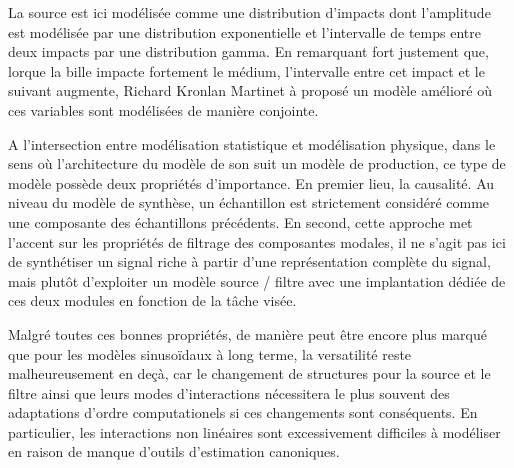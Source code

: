 \begin{marginfigure}
  \scalebox{.6}{
  }
  \label{fig:modal}
\caption{}
\end{marginfigure}

La source est ici modélisée comme une distribution d'impacts dont l'amplitude est modélisée par une distribution exponentielle et l'intervalle de temps entre deux impacts par une distribution gamma. En remarquant fort justement que, lorque la bille impacte fortement le médium, l'intervalle entre cet impact et le suivant augmente, Richard Kronlan Martinet\cite{conan2014synthesis} à proposé un modèle amélioré où ces variables sont modélisées de manière conjointe.

A l'intersection entre modélisation statistique et modélisation physique, dans le sens où l'architecture du modèle de son suit un modèle de production, ce type de modèle possède deux propriétés d'importance. En premier lieu, la causalité. Au niveau du modèle de synthèse, un échantillon est strictement considéré comme une composante des échantillons précédents. En second, cette approche met l'accent sur les propriétés de filtrage des composantes modales, il ne s'agit pas ici de synthétiser un signal riche à partir d'une représentation complète du signal, mais plutôt d'exploiter un modèle source / filtre avec une implantation dédiée de ces deux modules en fonction de la tâche visée.


Malgré toutes ces bonnes propriétés, de manière peut être encore plus marqué que pour les modèles sinusoïdaux à long terme, la versatilité reste malheureusement en deçà, car le changement de structures pour la source et le filtre ainsi que leurs modes d'interactions nécessitera le plus souvent des adaptations d'ordre computationels si ces changements sont conséquents. En particulier, les interactions non linéaires sont excessivement difficiles à modéliser en raison de manque d'outils d'estimation canoniques.

